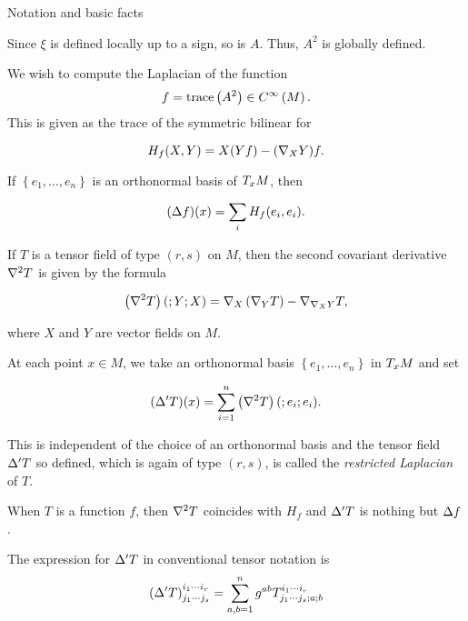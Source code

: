 \begin{frame}[allowframebreaks]{Notation and basic facts}
	\framebreak

	Since \(\xi\) is defined locally up to a sign, so is \(A\). Thus, \(A^{2}\)
	is globally defined.

	\framebreak

	We wish to compute the Laplacian of the function
	\[
		f=\trace{A^{2}}\in\functionspace{M}.
	\]
	This is given as the trace of the symmetric bilinear for

	\begin{equation}\label{eq:hessian-of-f}
		H_{f}(X,Y)=X(Yf)-(\immersionconn_{X}Y)f.
	\end{equation}

	If \(\left\{e_{1},\ldots,e_{n}\right\}\) is an orthonormal basis of
	\(\tangentspace{M}{x}\), then

	\begin{equation}\label{eq:laplacian-of-f-in-an-orthonormal-basis}
		(\laplacian{f})(x)=\sum_{i}H_{f}(e_{i},e_{i}).
	\end{equation}

	\framebreak

	If \(T\) is a tensor field of type \((r,s)\) on \(M\), then the second
	covariant derivative \(\immersionconn^{2}T\) is given by the formula

	\begin{equation}\label{eq:second-covariant-derivative-of-tensor-fields}
		\left(\immersionconn^{2}T\right)(;Y;X)=\immersionconn_{X}\left(\immersionconn_{Y}T\right)-\immersionconn_{\immersionconn_{X}{Y}}T,
	\end{equation}

	where \(X\) and \(Y\) are vector fields on \(M\).

	\framebreak

	At each point \(x\in{M}\), we take an orthonormal basis
	\(\left\{e_{1},\ldots,e_{n}\right\}\) in \(\tangentspace{M}{x}\) and set

	\begin{equation}\label{eq:restricted-laplacian-of-tensor-fields}
		(\restrictedlaplacian{T})(x)=\sum_{i=1}^{n}\left(\immersionconn^{2}T\right)(;e_{i};e_{i}).
	\end{equation}

	This is independent of the choice of an orthonormal basis and the tensor
	field \(\restrictedlaplacian{T}\) so defined, which is again of type
	\((r,s)\), is called the \textit{restricted Laplacian} of \(T\).

  \framebreak

  When \(T\) is a function \(f\), then \(\immersionconn^{2}T\) coincides with
  \(H_{f}\) and \(\restrictedlaplacian{T}\) is nothing but \(\laplacian{f}\).

  \framebreak

  The expression for \(\restrictedlaplacian{T}\) in conventional tensor notation is
  \[
    \left(\restrictedlaplacian{T}\right)^{i_{1}\cdots{i_{r}}}_{j_{1}\cdots{j_{s}}}
    =\sum_{a,b=1}^{n}g^{ab}T^{i_{1}\cdots{i_{r}}}_{j_{1}\cdots{j_{s}};a;b}
  \] 
\end{frame}
